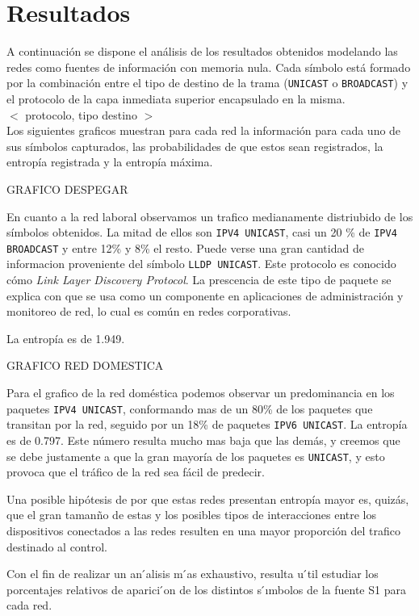 \section{Resultados}

A continuación se dispone el análisis de los resultados obtenidos modelando las redes como fuentes de información con memoria nula. Cada símbolo está formado por la combinación entre el tipo de destino de la trama (\texttt{UNICAST} o \texttt{BROADCAST}) y el protocolo de la capa inmediata superior encapsulado en la misma. \\

$<$ protocolo, tipo destino $>$ \\


Los siguientes graficos muestran para cada red la información para cada uno de sus símbolos capturados, las probabilidades de que estos sean registrados, la entropía registrada y la entropía máxima.

GRAFICO DESPEGAR

En cuanto a la red laboral observamos un trafico medianamente distriubido de los símbolos obtenidos. La mitad de ellos son \texttt{IPV4 UNICAST}, casi un 20 \% de \texttt{IPV4 BROADCAST} y entre 12\% y 8\% el resto. Puede verse una gran cantidad de informacion proveniente del símbolo \texttt{LLDP UNICAST}. Este protocolo es conocido cómo \textit{Link Layer Discovery Protocol}. La prescencia de este tipo de paquete se explica con que  se usa como un componente en aplicaciones de administración y monitoreo de red, lo cual es común en redes corporativas.

La entropía es de 1.949. 

GRAFICO RED DOMESTICA

Para el grafico de la red doméstica podemos observar un predominancia en los paquetes \texttt{IPV4 UNICAST}, conformando mas de un 80\% de los paquetes que transitan por la red, seguido por un 18\% de paquetes \texttt{IPV6 UNICAST}. La entropía es de 0.797. Este número resulta mucho mas baja que las demás, y creemos que se debe justamente a que la gran mayoría de los paquetes es \texttt{UNICAST}, y esto provoca que el tráfico de la red sea fácil de predecir.



Una posible hipótesis de por que estas redes presentan entropía mayor es, quizás, que el gran tamanño de estas y los posibles tipos de interacciones entre los dispositivos conectados a las redes resulten en una mayor proporción del trafico destinado al control.



Con el fin de realizar un an ́alisis m ́as exhaustivo, resulta u ́til estudiar los porcentajes relativos de aparici ́on de los distintos s ́ımbolos de la fuente S1 para cada red.
